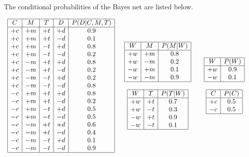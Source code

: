 \documentclass[12pt]{article}
\begin{document}
\noindent
The conditional probabilities of the Bayes net are listed below.

$$\begin{array}{ccc}
\begin{array}{|c|c|c|c|c|} \hline
C  & M  & T  & D  & P(D|C,M,T) \\ \hline
+c & +m & +t & +d & 0.9 \\
+c & +m & +t & -d & 0.1 \\
+c & +m & -t & +d & 0.8 \\
+c & +m & -t & -d & 0.2 \\
+c & -m & +t & +d & 0.8 \\
+c & -m & +t & -d & 0.2 \\
+c & -m & -t & +d & 0.2 \\
+c & -m & -t & -d & 0.8 \\
-c & +m & +t & +d & 0.8 \\
-c & +m & +t & -d & 0.2 \\
-c & +m & -t & +d & 0.5 \\
-c & +m & -t & -d & 0.5 \\
-c & -m & +t & +d & 0.6 \\
-c & -m & +t & -d & 0.4 \\
-c & -m & -t & +d & 0.1 \\
-c & -m & -t & -d & 0.9 \\\hline
\end{array} &
\begin{array}{c}
\begin{array}{|c|c|c|} \hline
W  & M  & P(M|W) \\ \hline
+w & +m & 0.8 \\
+w & -m & 0.2 \\
-w & +m & 0.1 \\
-w & -m & 0.9 \\ \hline
\end{array} \\
 \\
\begin{array}{|c|c|c|} \hline
W  & T  & P(T|W) \\ \hline
+w & +t & 0.7 \\
+w & -t & 0.3 \\
-w & +t & 0.9 \\
-w & -t & 0.1 \\ \hline
\end{array}
\end{array} &
\begin{array}{c}
\begin{array}{|c|c|} \hline
W  & P(W) \\ \hline
+w & 0.9  \\
-w & 0.1  \\ \hline
\end{array} \\
 \\
\begin{array}{|c|c|} \hline
C  & P(C) \\ \hline
+c & 0.5  \\
-c & 0.5  \\ \hline
\end{array}
\end{array}
\end{array}$$
\end{document}
